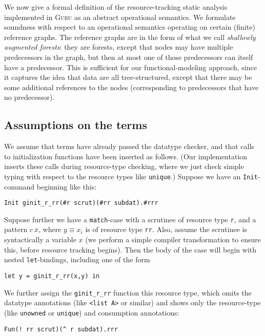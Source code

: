 \documentclass[9pt,natbib]{sigplanconf}
\begin{document}
We now give a formal definition of the resource-tracking static
analysis implemented in \textsc{Guru} as an abstract operational
semantics.  We formulate soundness with respect to an operational
semantics operating on certain (finite) reference graphs.  The
reference graphs are in the form of what we call \emph{shallowly
  augmented forests}: they are forests, except that nodes may have
multiple predecessors in the graph, but then at most one of those
predecessors can itself have a predecessor. This is sufficient for our
functional-modeling approach, since it captures the idea that data are
all tree-structured, except that there may be some additional
references to the nodes (corresponding to predecessors that have no
predecessor).  

\subsection{Assumptions on the terms}

We assume that terms have already passed the datatype checker, and
that calls to initialization functions have been inserted as follows.
(Our implementation inserts these calls during resource-type checking,
where we just check simple typing with respect to the resource types
like \texttt{unique}.)  Suppose we have an \texttt{Init}-command
beginning like this:

\begin{verbatim}
Init ginit_r_rr(#r scrut)(#rr subdat).#rrr
\end{verbatim}

\noindent Suppose further we have a \texttt{match}-case with a
scrutinee of resource type \texttt{r}, and a pattern $c\ \bar{x}$,
where $y\equiv x_i$ is of resource type \texttt{rr}.  Also, assume the
scrutinee is syntactically a variable $x$ (we perform a simple compiler
transformation to ensure this, before resource tracking begins).  Then
the body of the case will begin with nested \texttt{let}-bindings,
including one of the form

\begin{verbatim}
let y = ginit_r_rr(x,y) in
\end{verbatim}

\noindent We further assign the \texttt{ginit\_r\_rr} function this
resource type, which omits the datatype annotations (like
\texttt{<list A>} or similar) and shows only the resource-type (like
\texttt{unowned} or \texttt{unique}) and consumption annotations:

\begin{verbatim}
Fun(! rr scrut)(^ r subdat).rrr
\end{verbatim}
\end{document}
